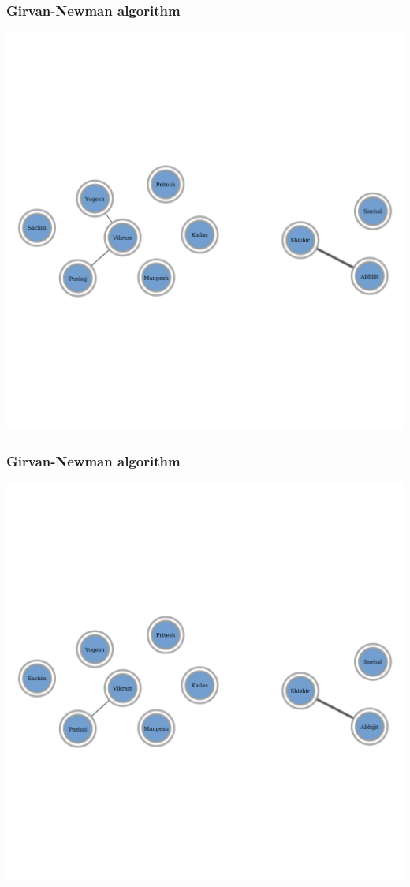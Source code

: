 \documentclass{beamer}
\begin{document}
\begin{frame}
    \frametitle{Girvan-Newman algorithm}
    \centering
    \includegraphics[width=0.8\columnwidth]{gn14.pdf}
\end{frame}
\begin{frame}
    \frametitle{Girvan-Newman algorithm}
    \centering
    \includegraphics[width=0.8\columnwidth]{gn15.pdf}
\end{frame}
\end{document}
